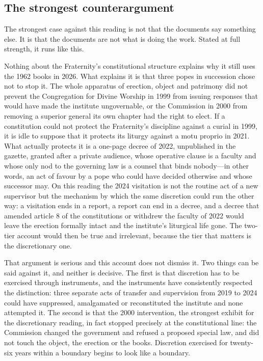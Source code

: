 \subsection{The strongest counterargument}

The strongest case against this reading is not that the documents say
something else. It is that the documents are not what is doing the work.
Stated at full strength, it runs like this.

Nothing about the Fraternity's constitutional structure explains why it
still uses the 1962 books in 2026. What explains it is that three popes
in succession chose not to stop it. The whole apparatus of erection,
object and patrimony did not prevent the Congregation for Divine Worship
in 1999 from issuing responses that would have made the institute
ungovernable, or the Commission in 2000 from removing a superior general
its own chapter had the right to elect. If a constitution could not
protect the Fraternity's discipline against a curial  in
1999, it is idle to suppose that it protects its liturgy against a motu
proprio in 2021. What actually protects it is a one-page decree of 2022,
unpublished in the gazette, granted after a private audience, whose
operative clause is a faculty and whose only nod to the governing law is a
counsel that binds nobody---in other words, an act of favour by a pope who
could have decided otherwise and whose successor may. On this reading the
2024 visitation is not the routine act of a new supervisor but the
mechanism by which the same discretion could run the other way: a
visitation ends in a report, a report can end in a decree, and a decree
that amended article 8 of the constitutions or withdrew the faculty of
2022 would leave the erection formally intact and the institute's
liturgical life gone. The two-tier account would then be true and
irrelevant, because the tier that matters is the discretionary one.

That argument is serious and this account does not dismiss it. Two things
can be said against it, and neither is decisive. The first is that
discretion has to be exercised through instruments, and the instruments
have consistently respected the distinction: three separate acts of
transfer and supervision from 2019 to 2024 could have suppressed,
amalgamated or reconstituted the institute and none attempted it. The
second is that the 2000 intervention, the strongest exhibit for the
discretionary reading, in fact stopped precisely at the constitutional
line: the Commission changed the government and refused a proposed special
law, and did not touch the object, the erection or the books. Discretion
exercised for twenty-six years within a boundary begins to look like a
boundary.

